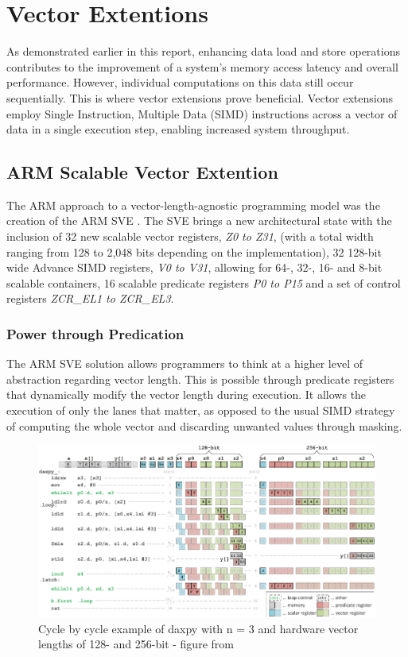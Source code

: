 \section{Vector Extentions}

As demonstrated earlier in this report, enhancing data load and store operations contributes to the improvement of a system's memory access latency and overall performance. However, individual computations on this data still occur sequentially. This is where vector extensions prove beneficial. Vector extensions employ Single Instruction, Multiple Data (SIMD) instructions across a vector of data in a single execution step, enabling increased system throughput.


\subsection{ARM Scalable Vector Extention}
\label{label:arm-sve}

The ARM approach to a vector-length-agnostic programming model was the creation of the ARM SVE \cite{arm-paper}. The SVE brings a new architectural state with the inclusion of 32 new scalable vector registers, \textit{Z0 to Z31}, (with a total width ranging from 128 to 2,048 bits depending on the implementation), 32 128-bit wide Advance SIMD registers, \textit{V0 to V31}, allowing for 64-, 32-, 16- and 8-bit scalable containers, 16 scalable predicate registers \textit{P0 to P15} and a set of control registers \textit{ZCR\_EL1 to ZCR\_EL3}.



\subsubsection{Power through Predication}
The ARM SVE solution allows programmers to think at a higher level of abstraction regarding vector length. This is possible through predicate registers that dynamically modify the vector length during execution. It allows the execution of only the lanes that matter, as opposed to the usual SIMD strategy of computing the whole vector and discarding unwanted values through masking.

\begin{figure}[H]
	\begin{center}
 		\includegraphics[width=0.77\linewidth]{images/predicator-example.pdf}
 		\caption{Cycle by cycle example of daxpy with n = 3 and hardware vector lengths of 128- and 256-bit - figure from \cite{arm-paper}}
 		\label{fig:arm-sve-assembly}
	\end{center} 
\end{figure}

